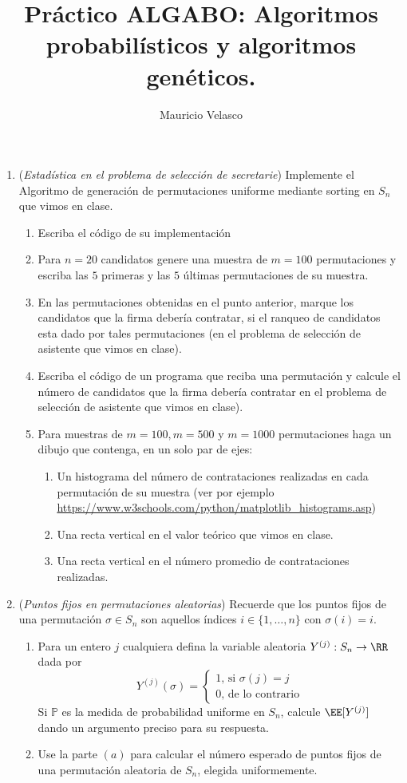 \documentclass[12pt, a4paper]{article}
\date{}
\begin{document}
\title{Pr\'actico ALGABO: Algoritmos probabilísticos y algoritmos genéticos.}
\author{Mauricio Velasco}
\maketitle{}
\begin{enumerate}
\item ({\it Estadística en el problema de selección de secretarie}) Implemente el Algoritmo de generación de permutaciones uniforme mediante sorting en $S_n$ que vimos en clase. 
\begin{enumerate}
\item Escriba el código de su implementación
\item Para $n=20$ candidatos genere una muestra de $m=100$ permutaciones y escriba las $5$ primeras y las $5$ últimas permutaciones de su muestra.
\item En las permutaciones obtenidas en el punto anterior, marque los candidatos que la firma debería contratar, si el ranqueo de candidatos esta dado por tales permutaciones (en el problema de selección de asistente que vimos en clase).
\item Escriba el código de un programa que reciba una permutación y calcule el número de candidatos que la firma debería contratar en el problema de selección de asistente que vimos en clase).
\item Para muestras de $m=100,m=500$ y $m=1000$ permutaciones haga un dibujo que contenga, en un solo par de ejes:
\begin{enumerate}
\item Un histograma del número de contrataciones  realizadas en cada permutación de su muestra (ver por ejemplo \url{https://www.w3schools.com/python/matplotlib_histograms.asp})
\item Una recta vertical en el valor teórico que vimos en clase.
\item Una recta vertical en el número promedio de contrataciones realizadas.
\end{enumerate}

\end{enumerate}



\item ({\it Puntos fijos en permutaciones aleatorias}) Recuerde que los puntos fijos de una permutación $\sigma\in S_n$ son aquellos índices $i\in \{1,\dots, n\}$ con $\sigma(i)=i$.
\begin{enumerate}
\item Para un entero $j$ cualquiera defina la variable aleatoria $Y^{(j)}:S_n\rightarrow \RR$ dada por
\[Y^{(j)}(\sigma)=
\begin{cases}
1\text{, si $\sigma(j)=j$}\\
0\text{, de lo contrario}
\end{cases}
\]
Si $\mathbb{P}$ es la medida de probabilidad uniforme en $S_n$, calcule $\EE[Y^{(j)}]$ dando un argumento preciso para su respuesta.
\item Use la parte $(a)$ para calcular el número esperado de puntos fijos de una permutación aleatoria de $S_n$, elegida uniformemente.
\end{enumerate}


\end{enumerate}
\end{document}
